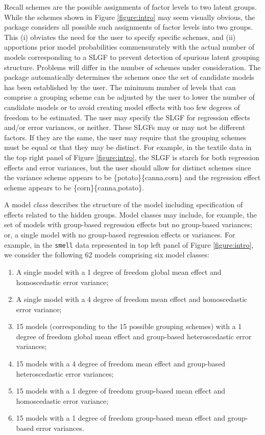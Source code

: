 Recall schemes are the possible assignments of factor levels to two latent groups. While the schemes shown in Figure \ref{figure:intro} may seem visually obvious, the  package considers all possible such assignments of factor levels into two groups. This (i) obviates the need for the user to specify specific schemes, and  (ii) apportions prior model probabilities commensurately with the actual number of models corresponding to a SLGF to prevent detection of spurious latent grouping structure. Problems will differ in the number of schemes under consideration. The package  automatically determines the schemes once the set of candidate models has been established by the user. The minimum number of levels that can comprise a grouping scheme can be adjusted by the user to lower the number of candidate models or to avoid creating model effects with too few degrees of freedom to be estimated. The user may specify the SLGF for regression effects and/or error variances, or neither. These SLGFs may or may not be different factors. If they are the same, the user may require that the grouping schemes must be equal or that they may be distinct. For example, in the textile data in the top right panel of Figure \ref{figure:intro}, the SLGF is starch for both regression effects and error variances, but the user should allow for distinct schemes since the variance scheme appears to be \{potato\}\{canna,corn\} and the regression effect scheme appears to be \{corn\}\{canna,potato\}. 

A model \textit{class} describes the structure of the model including specification of effects related to the hidden groups. Model classes may include, for example, the set of models with group-based regression effects but no group-based variances; or, a single model with no group-based regression effects or variances. For example, in the \texttt{smell} data represented in top left panel of Figure \ref{figure:intro}, we consider the following 62 models comprising six model classes:

\begin{enumerate}
\item A single model with a 1 degree of freedom global mean effect and homoscedastic error variance; 
\item A single model with a 4 degree of freedom mean effect and homoscedastic error variance; 
\item 15 models (corresponding to the 15 possible grouping schemes) with a 1 degree of freedom global mean effect and group-based heteroscedastic error variances; 
\item 15 models with a 4 degree of freedom mean effect and group-based heteroscedastic error variances; 
\item 15 models with a 1 degree of freedom group-based mean effect and homoscedastic error variance; 
\item 15 models with a 1 degree of freedom group-based mean effect and group-based error variances. 
\end{enumerate}

